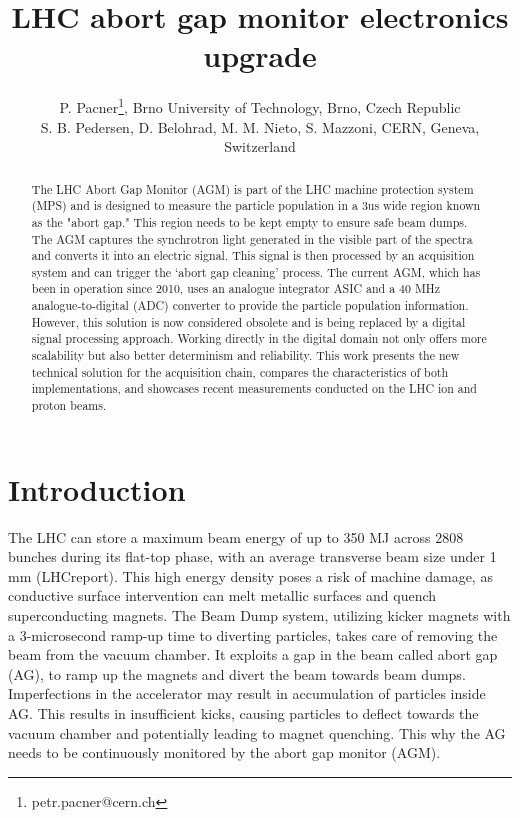 



\title{LHC abort gap monitor electronics upgrade}

\author{P. Pacner\thanks{petr.pacner@cern.ch}, Brno University of Technology, Brno, Czech Republic \\
		S. B. Pedersen, D. Belohrad, M. M. Nieto, S. Mazzoni, CERN, Geneva, Switzerland}
	
\maketitle

\begin{abstract}
    The LHC Abort Gap Monitor (AGM) is part of the LHC machine protection
    system (MPS) and is designed to measure the particle population in a 3us
    wide region known as the "abort gap." This region needs to be kept empty to
    ensure safe beam dumps. The AGM captures the synchrotron light generated in
    the visible part of the spectra and converts it into an electric signal.
    This signal is then processed by an acquisition system and can trigger the
    ‘abort gap cleaning’ process. The current AGM, which has been in operation
    since 2010, uses an analogue integrator ASIC and a 40 MHz
    analogue-to-digital (ADC) converter to provide the particle population
    information. However, this solution is now considered obsolete and is being
    replaced by a digital signal processing approach. Working directly in the
    digital domain not only offers more scalability but also better determinism
    and reliability. This work presents the new technical solution for the
    acquisition chain, compares the characteristics of both implementations,
    and showcases recent measurements conducted on the LHC ion and proton
    beams.
\end{abstract}

\section{Introduction}
The LHC can store a maximum beam energy of up to 350 MJ across 2808 bunches
during its flat-top phase, with an average transverse beam size under 1 mm
(LHCreport). This high energy density poses a risk of machine damage, as
conductive surface intervention can melt metallic surfaces and quench
superconducting magnets. The Beam Dump system, utilizing kicker magnets with a
3-microsecond ramp-up time to diverting particles, takes care of removing the beam
from the vacuum chamber. It exploits a gap in the beam called abort gap (AG),
to ramp up the magnets and divert the beam towards beam dumps.
Imperfections in the accelerator may result in accumulation of particles inside
AG. This results in insufficient kicks, causing particles to deflect
towards the vacuum chamber and potentially leading to magnet quenching. This
why the AG needs to be continuously monitored by the abort gap monitor (AGM).

